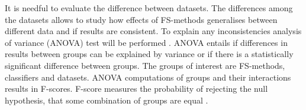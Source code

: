 It is needful to evaluate the difference between datasets. The differences among the datasets allows to study how effects of FS-methods generalises between different data and if results are consistent. To explain any inconsistencies analysis of variance (ANOVA) test will be performed \parencite{sthle1989}. ANOVA entails if differences in results between groups can be explained by variance or if there is a statistically significant difference between groups. The groups of interest are FS-methods, classifiers and datasets. ANOVA computations of groups and their interactions results in F-scores. F-score measures the probability of rejecting the null hypothesis, that some combination of groups are equal \parencite{sthle1989}.
